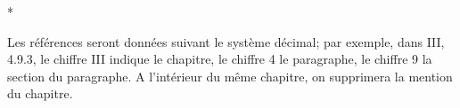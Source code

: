 \bigskip
\begin{center}*\quad*\quad*\end{center}
\bigskip

Les références seront données suivant le système décimal; par exemple, dans III, 4.9.3, le chiffre III indique le chapitre, le chiffre 4 le paragraphe, le chiffre 9 la section du paragraphe.
A l'intérieur du même chapitre, on supprimera la mention du chapitre.

